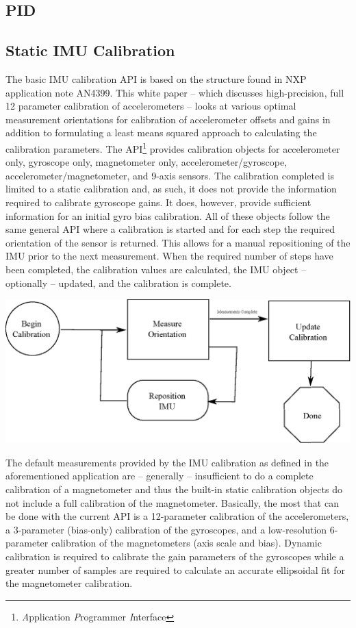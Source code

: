 \documentclass[10pt,letterpaper]{memoir} %
\begin{document}
\subsection{PID}

\subsection{Static IMU Calibration}
The basic IMU calibration API is based on the structure found in NXP application note AN4399.  This white paper -- which discusses high-precision, full 12 parameter calibration of accelerometers -- looks at various optimal measurement orientations for calibration of accelerometer offsets and gains in addition to formulating a least means squared approach to calculating the calibration parameters.  The API\footnote{\emph{A}pplication \emph{P}rogrammer \emph{I}nterface} provides calibration objects for accelerometer only, gyroscope only, magnetometer only, accelerometer/gyroscope, accelerometer/magnetometer, and 9-axis sensors.  The calibration completed is limited to a static calibration and, as such, it does not provide the information required to calibrate gyroscope gains.  It does, however, provide sufficient information for an initial gyro bias calibration.  All of these objects follow the same general API where a calibration is started and for each step the required orientation of the sensor is returned.  This allows for a manual repositioning of the IMU prior to the next measurement.  When the required number of steps have been completed, the calibration values are calculated, the IMU object -- optionally -- updated, and the calibration is complete.

\includegraphics{imu_calibration_flow.eps}

The default measurements provided by the IMU calibration as defined in the aforementioned application are -- generally -- insufficient to do a complete calibration of a magnetometer and thus the built-in static calibration objects do not include a full calibration of the magnetometer.  Basically, the most that can be done with the current API is a 12-parameter calibration of the accelerometers, a 3-parameter (bias-only) calibration of the gyroscopes, and a low-resolution 6-parameter calibration of the magnetometers (axis scale and bias).  Dynamic calibration is required to calibrate the gain parameters of the gyroscopes while a greater number of samples are required to calculate an accurate ellipsoidal fit for the magnetometer calibration.
\end{document}
